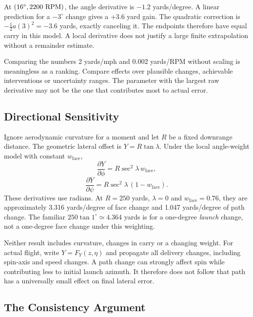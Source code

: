 At $(16^\circ,2200\ {\rm RPM})$, the angle derivative is $-1.2$ yards/degree.
A linear prediction for a $-3^\circ$ change gives a $+3.6$ yard gain. The
quadratic correction is $-\tfrac12 a(3)^2=-3.6$ yards, exactly canceling it.
The endpoints therefore have equal carry in this model. A local derivative
does not justify a large finite extrapolation without a remainder estimate.

Comparing the numbers 2 yards/mph and 0.002 yards/RPM without scaling is
meaningless as a ranking. Compare effects over plausible changes, achievable
interventions or uncertainty ranges. The parameter with the largest raw
derivative may not be the one that contributes most to actual error.

\subsection{Directional Sensitivity}

Ignore aerodynamic curvature for a moment and let $R$ be a fixed downrange
distance. The geometric lateral offset is $Y=R\tan\lambda$. Under the local
angle-weight model with constant $w_{\mathrm{face}}$,
\begin{equation}
\frac{\partial Y}{\partial\phi}=R\sec^2\lambda\,w_{\mathrm{face}},
\label{eq:sensitivity_face}
\end{equation}
\begin{equation}
\frac{\partial Y}{\partial\psi}=R\sec^2\lambda\,(1-w_{\mathrm{face}}).
\label{eq:sensitivity_path}
\end{equation}
These derivatives use radians. At $R=250$ yards, $\lambda=0$ and $w_{\mathrm{face}}=0.76$,
they are approximately 3.316 yards/degree of face change and 1.047
yards/degree of path change. The familiar $250\tan1^\circ\simeq4.364$ yards
is for a one-degree \emph{launch} change, not a one-degree face change under
this weighting.

Neither result includes curvature, changes in carry or a changing weight.
For actual flight, write $Y=F_Y(z,\eta)$ and propagate all delivery changes,
including spin-axis and speed changes. A path change can strongly affect spin
while contributing less to initial launch azimuth. It therefore does not
follow that path has a universally small effect on final lateral error.

\subsection{The Consistency Argument}

